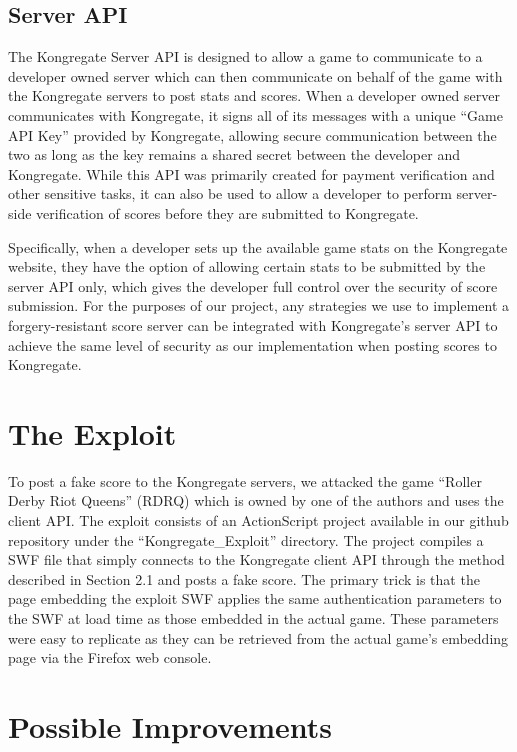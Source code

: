 \documentclass [11pt,twocolumn] {article}
\begin{document}
\subsection {Server API} 

The Kongregate Server API is designed to allow a game to communicate to a developer owned server which can then communicate on behalf of the game with the Kongregate servers to post stats and scores. When a developer owned server communicates with Kongregate, it signs all of its messages with a unique ``Game API Key'' provided by Kongregate, allowing secure communication between the two as long as the key remains a shared secret between the developer and Kongregate. While this API was primarily created for payment verification and other sensitive tasks, it can also be used to allow a developer to perform server-side verification of scores before they are submitted to Kongregate. 

Specifically, when a developer sets up the available game stats on the Kongregate website, they have the option of allowing certain stats to be submitted by the server API only, which gives the developer full control over the security of score submission. For the purposes of our project, any strategies we use to implement a forgery-resistant score server can be integrated with Kongregate's server API to achieve the same level of security as our implementation when posting scores to Kongregate. 

\section { The Exploit }

To post a fake score to the Kongregate servers, we attacked the game ``Roller Derby Riot Queens'' (RDRQ) which is owned by one of the authors and uses the client API. The exploit consists of an ActionScript project available in our github repository under the ``Kongregate\_Exploit'' directory. The project compiles a SWF file that simply connects to the Kongregate client API through the method described in Section 2.1 and posts a fake score. The primary trick is that the page embedding the exploit SWF applies the same authentication parameters to the SWF at load time as those embedded in the actual game. These parameters were easy to replicate as they can be retrieved from the actual game's embedding page via the Firefox web console. 

\section { Possible Improvements } 
\end{document}
